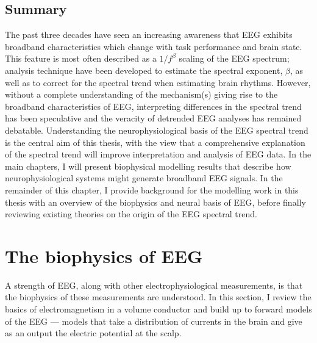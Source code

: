 \subsection{Summary}
The past three decades have seen an increasing awareness that EEG exhibits broadband characteristics which change with task performance and brain state. This feature is most often described as a $1/f^\beta$ scaling of the EEG spectrum; analysis technique have been developed to estimate the spectral exponent, $\beta$, as well as to correct for the spectral trend when estimating brain rhythms. However, without a complete understanding of the mechanism(s) giving rise to the broadband characteristics of EEG, interpreting differences in the spectral trend has been speculative and the veracity of detrended EEG analyses has remained debatable. Understanding the neurophysiological basis of the EEG spectral trend is the central aim of this thesis, with the view that a comprehensive explanation of the spectral trend will improve interpretation and analysis of EEG data. In the main chapters, I will present biophysical modelling results that describe how neurophysiological systems might generate broadband EEG signals. In the remainder of this chapter, I provide background for the modelling work in this thesis with an overview of the biophysics and neural basis of EEG, before finally reviewing existing theories on the origin of the EEG spectral trend.

\section{The biophysics of EEG} \label{sec:EM_theory}

A strength of EEG, along with other electrophysiological measurements, is that the biophysics of these measurements are understood. In this section, I review the basics of electromagnetism in a volume conductor and build up to forward models of the EEG --- models that take a distribution of currents in the brain and give as an output the electric potential at the scalp.


